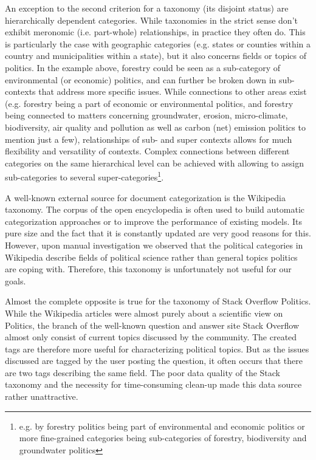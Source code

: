 An exception to the second criterion for a taxonomy (its disjoint status) are hierarchically dependent categories. While taxonomies in the strict sense don't exhibit meronomic (i.e. part-whole) relationships, in practice they often do. This is particularly the case with geographic categories (e.g. states or counties within a country and municipalities within a state), but it also concerns fields or topics of politics. In the example above, forestry could be seen as a sub-category of environmental (or  economic) politics, and can further be broken down in sub-contexts that address more specific issues. While connections to other areas exist (e.g. forestry being a part of economic or environmental politics, and forestry being connected to matters concerning groundwater, erosion, micro-climate, biodiversity, air quality and pollution as well as carbon (net) emission politics to mention just a few), relationships of sub- and super contexts allows for much flexibility and versatility of contexts. Complex connections between different categories on the same hierarchical level can be achieved with allowing to assign sub-categories to several super-categories\footnote{e.g. by forestry politics being part of environmental and economic politics or more fine-grained categories being sub-categories of forestry, biodiversity and groundwater politics}.

A well-known external source for document categorization is the Wikipedia taxonomy.
The corpus of the open encyclopedia is often used to build automatic categorization approaches or to improve the performance of existing models.
Its pure size and the fact that it is constantly updated are very good reasons for this.
However, upon manual investigation we observed that the political categories in Wikipedia describe fields of political science rather than general topics politics are coping with. 
Therefore, this taxonomy is unfortunately not useful for our goals.

Almost the complete opposite is true for the taxonomy of Stack Overflow Politics.
While the Wikipedia articles were almost purely about a scientific view on Politics, the branch of the well-known question and answer site Stack Overflow almost only consist of current topics discussed by the community.
The created tags are therefore more useful for characterizing political topics.
But as the issues discussed are tagged by the user posting the question, it often occurs that there are two tags describing the same field.
The poor data quality of the Stack taxonomy and the necessity for time-consuming clean-up made this data source rather unattractive.

